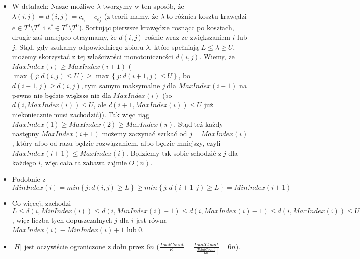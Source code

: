 \begin{itemize}
	\item W detalach: Nasze możliwe $\lambda$ tworzymy w ten sposób, że $\lambda \left( i, j \right) = d \left( i, j \right) = c_{e_{i}} - c_{e^{\ast}_{j}}$ (z teorii mamy, że $\lambda$ to różnica kosztu krawędzi $ e \in T^{0} \setminus T^{\ast}$ i $e^{\ast} \in T^{\ast} \setminus T^{0}$). Sortując pierwsze krawędzie rosnąco po kosztach, drugie zaś malejąco otrzymamy, że $d \left( i, j \right)$ rośnie wraz ze zwiększaniem $i$ lub $j$. Stąd, gdy szukamy odpowiedniego zbioru $\lambda$, które spełniają $L \leqslant \lambda \geqslant U$, możemy skorzystać z tej właściwości monotoniczności $d \left( i, j \right)$. Wiemy, że $MaxIndex \left( i \right) \geqslant MaxIndex \left( i + 1 \right)$ ($\max \left\{ j : d \left( i, j \right) \leqslant U \right\} \geqslant \max \left\{ j : d \left( i + 1, j \right) \leqslant U \right\}$, bo $d \left( i + 1, j \right) \geqslant d \left( i, j \right)$, tym samym maksymalne $j$ dla $MaxIndex \left( i + 1 \right)$ na pewno nie będzie większe niż dla $MaxIndex \left( i \right)$ (bo $d \left( i, MaxIndex \left( i \right) \right) \leqslant U$, ale $d \left( i + 1, MaxIndex \left( i \right) \right) \leqslant U$ już niekoniecznie musi zachodzić)). Tak więc ciąg $MaxIndex \left( 1 \right) \geqslant MaxIndex \left( 2 \right) \geqslant MaxIndex \left( n \right)$. Stąd też każdy następny $MaxIndex \left( i + 1 \right)$ możemy zaczynać szukać od $j = MaxIndex \left( i \right)$, który albo od razu będzie rozwiązaniem, albo będzie mniejszy, czyli $MaxIndex \left( i + 1 \right) \leqslant MaxIndex \left( i \right)$. Będziemy tak sobie schodzić z $j$ dla każdego $i$, więc cała ta zabawa zajmie $O \left( n \right)$.
	
	\item Podobnie z $MinIndex \left( i \right) = min \left\{ j : d \left( i, j \right) \geqslant L \right\} \geqslant min \left\{ j : d \left( i + 1, j \right) \geqslant L \right\} = MinIndex \left( i + 1 \right)$
	
	\item Co więcej, zachodzi $L \leqslant d \left( i, MinIndex \left( i \right) \right) \leqslant d \left( i, MinIndex \left( i \right) + 1 \right) \leqslant d \left( i, MaxIndex \left( i \right) - 1 \right) \leqslant d \left( i, MaxIndex \left( i \right) \right) \leqslant U$, więc liczba tych dopuszczalnych $j$ dla $i$ jest równa $MaxIndex \left( i \right) - MinIndex \left( i \right) + 1$ lub $0$.
	
	\item $\left| H \right|$ jest oczywiście ograniczone z dołu przez $6n$ ($\frac{TotalCount}{K} = \frac{TotalCount}{\left \lfloor \frac{TotalCount}{6n} \right \rfloor} = 6n$).
	

\end{itemize}
